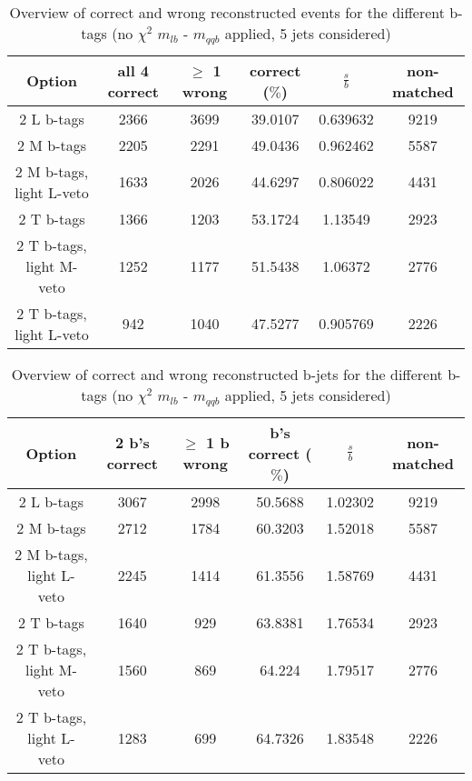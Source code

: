\begin{table}[!h] 
 \begin{tabular}{c|c|c|c|c|c} 
  \textbf{Option} & all 4 correct & $\geq$ 1 wrong       & correct ($\%$)       & $\frac{s}{b}$ & non-matched \\ \hline 
  2 L b-tags              & 2366 & 3699 & 39.0107 & 0.639632 & 9219\\ 
  2 M b-tags              & 2205 & 2291 & 49.0436 & 0.962462 & 5587\\ 
  2 M b-tags, light L-veto & 1633 & 2026 & 44.6297 & 0.806022 & 4431\\ 
  2 T b-tags              & 1366 & 1203 & 53.1724 & 1.13549 & 2923\\ 
  2 T b-tags, light M-veto & 1252 & 1177 & 51.5438 & 1.06372 & 2776\\ 
  2 T b-tags, light L-veto & 942 & 1040 & 47.5277 & 0.905769 & 2226\\ 
 \end{tabular} 
 \caption{Overview of correct and wrong reconstructed events for the different b-tags (no $\chi^{2}$ $m_{lb}$ - $m_{qqb}$ applied, 5 jets considered)}
\end{table} 
 
\begin{table}[!h] 
 \begin{tabular}{c|c|c|c|c|c} 
  \textbf{Option} & 2 b's correct & $\geq$ 1 b wrong     & b's correct ($\%$)   & $\frac{s}{b}$ & non-matched \\ \hline 
  2 L b-tags              & 3067 & 2998 & 50.5688 & 1.02302 & 9219\\ 
  2 M b-tags              & 2712 & 1784 & 60.3203 & 1.52018 & 5587\\ 
  2 M b-tags, light L-veto & 2245 & 1414 & 61.3556 & 1.58769 & 4431\\ 
  2 T b-tags              & 1640 & 929 & 63.8381 & 1.76534 & 2923\\ 
  2 T b-tags, light M-veto & 1560 & 869 & 64.224 & 1.79517 & 2776\\ 
  2 T b-tags, light L-veto & 1283 & 699 & 64.7326 & 1.83548 & 2226\\ 
 \end{tabular} 
 \caption{Overview of correct and wrong reconstructed b-jets for the different b-tags (no $\chi^{2}$ $m_{lb}$ - $m_{qqb}$ applied, 5 jets considered)}
\end{table} 
 
